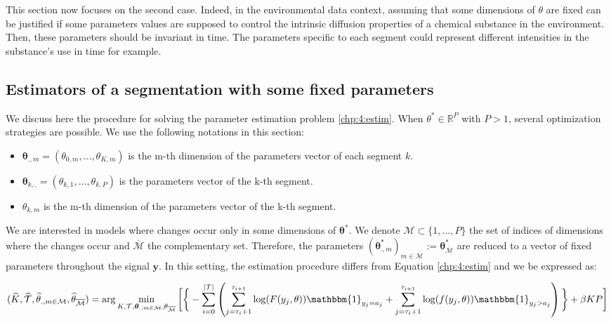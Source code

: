 This section now focuses on the second case. Indeed, in the environmental data context, assuming that some dimensions of $\theta$ are fixed can be justified if some parameters values are supposed to control the intrinsic diffusion properties of a chemical substance in the environment. Then, these parameters should be invariant in time. The parameters specific to each segment could represent different intensities in the substance's use in time for example. 

\subsection{Estimators of a segmentation with some fixed parameters}

We discuss here the procedure for solving the parameter estimation problem \eqref{chp:4:estim}. When $\theta^* \in \mathbb{R}^P$ with $P > 1$, several optimization strategies are possible. We use the following notations in this section: 
\begin{itemize}
\item $\bm \theta_{.,m} = (\theta_{0,m},\dots,\theta_{K,m})$ is the m-th dimension of the parameters vector of each segment $k$.
\item $\bm \theta_{k,.} = (\theta_{k,1},\dots,\theta_{k,P})$ is the parameters vector of the k-th segment.
\item $\theta_{k,m}$ is the m-th dimension of the parameters vector of the k-th segment.
\end{itemize}

We are interested in models where changes occur only in some dimensions of $\bm\theta^*$. We denote $\mathcal{M} \subset \{1,\dots,P\}$ the set of indices of dimensions where the changes occur and $\overline{\mathcal{M}}$ the complementary set. Therefore, the parameters $(\bm\theta^*_{.,m})_{m \in \overline{\mathcal{M}}} := \bm\theta^*_{\overline{\mathcal{M}}}$ are reduced to a vector of fixed parameters throughout the signal $\bm y$. In this setting, the estimation procedure differs from Equation \eqref{chp:4:estim} and we be expressed as: 


\begin{dmath}\label{chp:4:estimproc}
(\widehat{K},\widehat{\TT},\widehat{\theta}_{.,m\in\mathcal{M}},\widehat{\theta}_{\overline{\mathcal{M}}}) = \arg\min_{K,\TT,\bm \theta_{.,m\in\mathcal{M}},\theta_{\overline{\mathcal{M}}}}\bigg[\bigg\{ - \sum_{i=0}^{\lvert \TT \rvert}  \left(\sum_{j=\tau_i+1}^{\tau_{i+1}}\log(F(y_j,\theta))\mathbbm{1}_{y_j=a_j}+\sum_{j=\tau_i+1}^{\tau_{i+1}}\log(f(y_j,\theta))\mathbbm{1}_{y_j>a_j}\right)\bigg\}+\beta KP \bigg]
\end{dmath}

